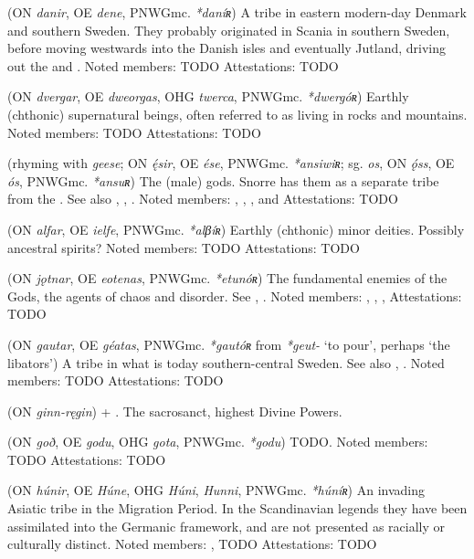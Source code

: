 \begin{itemize}

 (ON \emph{danir}, OE \emph{dene}, PNWGmc. \emph{*daníʀ})
  A tribe in eastern modern-day Denmark and southern Sweden. They probably originated in Scania in southern Sweden, before moving westwards into the Danish isles and eventually Jutland, driving out the  and .
  Noted members: TODO
  Attestations: TODO

 (ON \emph{dvergar}, OE \emph{dweorgas}, OHG \emph{twerca}, PNWGmc. \emph{*dwergóʀ})
  Earthly (chthonic) supernatural beings, often referred to as living in rocks and mountains.
  Noted members: TODO
  Attestations: TODO

 (rhyming with \emph{geese}; ON \emph{ę́sir}, OE \emph{ése}, PNWGmc. \emph{*ansiwiʀ}; sg. \emph{os}, ON \emph{ǫ́ss}, OE \emph{ós}, PNWGmc. \emph{*ansuʀ})
  The (male) gods. Snorre has them as a separate tribe from the . See also , , .
  Noted members: , , ,  and 
  Attestations: TODO

 (ON \emph{alfar}, OE \emph{ielfe}, PNWGmc. \emph{*alβíʀ})
  Earthly (chthonic) minor deities. Possibly ancestral spirits?
  Noted members: TODO
  Attestations: TODO

 (ON \emph{jǫtnar}, OE \emph{eotenas}, PNWGmc. \emph{*etunóʀ})
  The fundamental enemies of the Gods, the agents of chaos and disorder. See , .
  Noted members: , , , 
  Attestations: TODO

 (ON \emph{gautar}, OE \emph{géatas}, PNWGmc. \emph{*gautóʀ} from \emph{*geut-} ‘to pour’, perhaps ‘the libators’)
  A tribe in what is today southern-central Sweden. See also , .
  Noted members: TODO
  Attestations: TODO

 (ON \emph{ginn-ręgin})
   + . The sacrosanct, highest Divine Powers.

 (ON \emph{goð}, OE \emph{godu}, OHG \emph{gota}, PNWGmc. \emph{*godu})
  TODO.
  Noted members: TODO
  Attestations: TODO

 (ON \emph{húnir}, OE \emph{Húne}, OHG \emph{Húni}, \emph{Hunni}, PNWGmc. \emph{*húníʀ})
  An invading Asiatic tribe in the Migration Period. In the Scandinavian legends they have been assimilated into the Germanic framework, and are not presented as racially or culturally distinct.
  Noted members: , TODO
  Attestations: TODO


\end{itemize}
